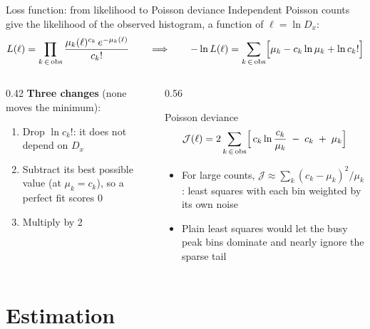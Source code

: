 \documentclass[aspectratio=169,10pt]{beamer}
\newcommand{\J}{\mathcal{J}}
\begin{document}
\begin{frame}{Loss function: from likelihood to Poisson deviance}
Independent Poisson counts give the likelihood of the observed histogram, a function of $\ell = \ln D_x$:
\[
L(\ell) = \prod_{k\,\in\,\text{obs}}\frac{\mu_k(\ell)^{c_k}\,e^{-\mu_k(\ell)}}{c_k!}
\qquad\Longrightarrow\qquad
-\ln L(\ell) = \sum_{k\,\in\,\text{obs}}\Bigl[\mu_k - c_k\ln\mu_k + \ln c_k!\Bigr]
\]
\begin{columns}[T]
\begin{column}{0.42\textwidth}
\textbf{Three changes} (none moves the minimum):
\begin{enumerate}
\item Drop $\ln c_k!$: it does not depend on $D_x$
\item Subtract its best possible value (at $\mu_k = c_k$), so a perfect fit scores 0
\item Multiply by 2
\end{enumerate}
\end{column}
\begin{column}{0.56\textwidth}
\begin{block}{Poisson deviance}
\vspace{-0.5em}
\[
\J(\ell) = 2\sum_{k\,\in\,\text{obs}}\Bigl[\,c_k\ln\frac{c_k}{\mu_k} \;-\; c_k \;+\; \mu_k\Bigr]
\]
\end{block}
\small
\begin{itemize}
\item For large counts, $\J\approx\sum_k (c_k-\mu_k)^2/\mu_k$: least squares with each bin weighted by its own noise
\item Plain least squares would let the busy peak bins dominate and nearly ignore the sparse tail
\end{itemize}
\end{column}
\end{columns}
\end{frame}

\section{Estimation}
\end{document}
